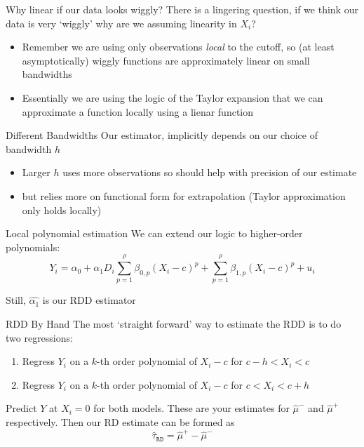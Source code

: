 \documentclass[aspectratio=169,t,11pt,table]{beamer}
\begin{document}

\begin{frame}{Why linear if our data looks wiggly?}
  There is a lingering question, if we think our data is very `wiggly' why are we assuming linearity in $X_i$?

  \begin{itemize}
    \item Remember we are using only observations \emph{local} to the cutoff, so (at least asymptotically) wiggly functions are approximately linear on small bandwidths
    
    \item Essentially we are using the logic of the Taylor expansion that we can approximate a function locally using a lienar function
  \end{itemize}
\end{frame}


\begin{frame}{Different Bandwidths}{}
  Our estimator, implicitly depends on our choice of bandwidth $h$
  \begin{itemize}
    \item Larger $h$ uses more observations so should help with precision of our estimate
    \item but relies more on functional form for extrapolation (Taylor approximation only holds locally)
  \end{itemize}
\end{frame}


\begin{frame}{Local polynomial estimation}{}
  We can extend our logic to higher-order polynomials:
  $$
    Y_i = \alpha_0 + \alpha_1 D_i \sum_{p = 1}^\rho \beta_{0,p} (X_i - c)^p + \sum_{p = 1}^\rho \beta_{1,p} (X_i - c)^p + u_i
  $$
  
  Still, $\hat{\alpha_1}$ is our RDD estimator
\end{frame}


\begin{frame}{RDD By Hand}{}
  The most `straight forward' way to estimate the RDD is to do two regressions:
  \begin{enumerate}
    \item Regress $Y_i$ on a $k$-th order polynomial of $X_i - c$ for $c - h < X_i < c$
    \item Regress $Y_i$ on a $k$-th order polynomial of $X_i - c$ for $c < X_i < c + h$
  \end{enumerate}

  \bigskip
  Predict $Y$ at $X_i = 0$ for both models. These are your estimates for $\hat{\mu}^-$ and $\hat{\mu}^+$ respectively. Then our RD estimate can be formed as
  $$
    \hat{\tau}_{\texttt{RD}} = \hat{\mu}^+ - \hat{\mu}^-
  $$
\end{frame}
\end{document}
